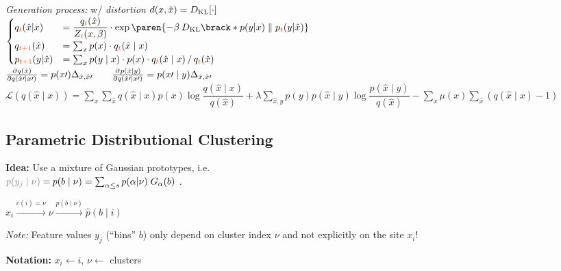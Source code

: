 \emph{Generation process:}\enskip
w/ \textit{distortion} $d(x,\hat x) = D_\mathrm{KL}[\cdot]$\\
$\begin{cases}\begin{matrix*}[l]
    q_{\color{OrangeRed} t}(\hat x\vert x) &
        = \dfrac{q_{\color{OrangeRed} t}(\hat x)}{Z_{\color{OrangeRed} t}(x, \beta)} \cdot \exp\paren{ -\beta \: D\ped{KL}\brack*{p(y\vert x) \parallel p_{\color{red} t}(y\vert \hat x)} }
    \\
    q_{\color{OrangeRed} t{+}1}(\hat x) &
        = \sum_x p(x) \cdot q_{\color{OrangeRed} t}(\hat x \mid x)
    \\
    p_{\color{OrangeRed} t{+}1}(y\vert \hat x) &
        = \sum_{x} p(y\mid x) \cdot p(x) \cdot q_{\color{OrangeRed} t}(\hat x\mid x) \,/\, q_{\color{OrangeRed} t}(\hat x)
\end{matrix*}\end{cases}$\\
$\pderiv{q(\hat{x})}{q(\hat{x}\prime\mid x\prime)}= p(x\prime)\Delta_{\hat{x}, \hat{x}\prime} \qquad \pderiv{p(\hat{x}\mid y)}{q(\hat{x}\prime\mid x\prime)}=p(x\prime\mid y)\Delta_{\hat{x}, \hat{x}\prime}$\\
$\mathcal{L}(q(\hat{x}\mid x))=\sum_x\sum_{\hat{x}} q(\hat{x}\mid x)p(x)\log\dfrac{q(\hat{x}\mid x)}{q(\hat{x})}+\lambda\sum_{\hat{x}, y}p(y)p(\hat{x}\mid y)\log\dfrac{p(\hat{x}\mid y)}{q(\hat{x})} - \sum_x\mu(x)\sum_{\hat{x}}(q(\hat{x}\mid x) - 1)$

\subsection{Parametric Distributional Clustering}

\textbf{Idea:} Use a mixture of Gaussian prototypes, i.e.\\  $\textcolor{gray}{p(y_j\mid\nu)\equiv\:} p(b\mid\nu) = \sum_{\alpha\leq s} p(\alpha\vert\nu) \; G_\alpha(b)$ .

\begin{minipage}{\linewidth}
    \centering
    $x_i \xrightarrow{c(i) = \nu} \nu \xrightarrow{p(b\mid\nu)} \hat p(b\mid i)$
\end{minipage}

\textit{Note:}\enspace
Feature values $y_j$ (``bins'' $b$) only depend on cluster index $\nu$ and not explicitly on the site $x_i$!

\textbf{Notation:}\enspace
$x_i \leftarrow i$, \enskip
{} \enskip
$\nu \leftarrow$ clusters

